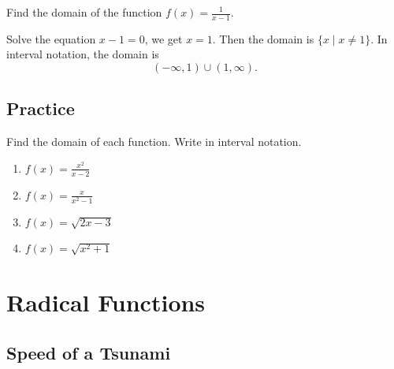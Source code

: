 \documentclass[en,12pt]{elegantbook}
\providecommand{\tightlist}{%
  \setlength{\itemsep}{0pt}\setlength{\parskip}{0pt}}
\providecommand{\tightlist}{%
  \setlength{\itemsep}{0pt}\setlength{\parskip}{0pt}}
\let\BeginKnitrBlock\begin \let\EndKnitrBlock\end
\begin{document}
\BeginKnitrBlock{example}
\protect\hypertarget{exm:unnamed-chunk-270}{}{\label{exm:unnamed-chunk-270} }
Find the domain of the function \(f(x)=\frac{1}{x-1}\).
\EndKnitrBlock{example}

\BeginKnitrBlock{solution}


Solve the equation \(x-1=0\), we get \(x=1\). Then the domain is \(\{x\mid x\neq 1\}\). In interval notation, the domain is
\[
(-\infty, 1)\cup (1,\infty).
\]
\EndKnitrBlock{solution}

\hypertarget{practice-13}{%
\section{Practice}\label{practice-13}}

\BeginKnitrBlock{exercise}
\protect\hypertarget{exr:unnamed-chunk-272}{}{\label{exr:unnamed-chunk-272} }
Find the domain of each function. Write in interval notation.

\begin{enumerate}
\def\labelenumi{\arabic{enumi}.}
\tightlist
\item
  \(f(x)=\frac{x^2}{x-2}\)
\item
  \(f(x)=\frac{x}{x^2-1}\)
\item
  \(f(x)=\sqrt{2x-3}\)
\item
  \(f(x)=\sqrt{x^2+1}\)\hfill\null
\end{enumerate}
\EndKnitrBlock{exercise}

\hypertarget{radical-functions}{%
\chapter{Radical Functions}\label{radical-functions}}

\hypertarget{speed-of-a-tsunami}{%
\section{Speed of a Tsunami}\label{speed-of-a-tsunami}}
\end{document}
